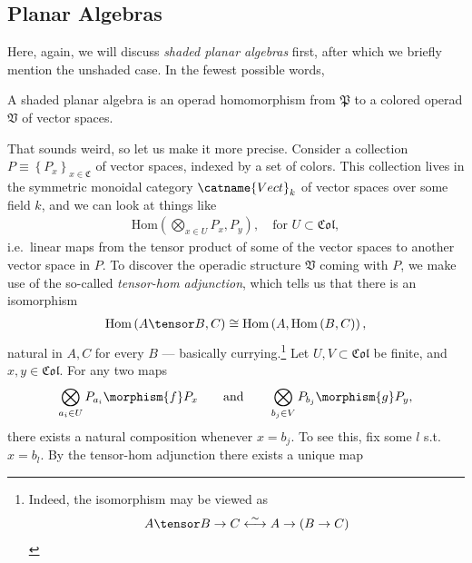 \subsection{Planar Algebras}
Here, again, we will discuss \emph{shaded planar algebras} first, after which we briefly mention the unshaded case. In the fewest possible words,
\begin{center}
\begin{minipage}{0.8\textwidth}
A shaded planar algebra is an operad homomorphism from $\mathfrak{P}$ to a colored operad $\mathfrak{V}$ of vector spaces.\footnotemark
\end{minipage}
\end{center}
That sounds weird, so let us make it more precise. Consider a collection $P\equiv\left\{ P_x \right\}_{x\in\mathfrak{C}}$ of vector spaces, indexed by a set of colors. This collection lives in the symmetric monoidal category $\catname{Vect}_k$ of vector spaces over some field $k$, and we can look at things like
\begin{align*}
\mathrm{Hom}\left( \bigotimes_{x\in U} P_x, P_y\right),\quad \text{for } U\subset\mathfrak{Col},
\end{align*}
i.e.\ linear maps from the tensor product of some of the vector spaces to another vector space in $P$. To discover the operadic structure $\mathfrak{V}$ coming with $P$, we make use of the so-called \emph{tensor-hom adjunction}, which tells us that there is an isomorphism
\begin{align*}
\mathrm{Hom}\left( A\tensor B, C \right)\cong \mathrm{Hom}\left( A,\mathrm{Hom}\left( B,C \right) \right),
\end{align*}
natural in $A, C$ for every $B$ \cite[p 505 f]{aluffi2009algebra} --- basically currying.\footnote{Indeed, the isomorphism may be viewed as
\begin{align*}
A\tensor B \rightarrow C \overset{\sim}{\longleftrightarrow} A\rightarrow\left( B\rightarrow C \right)
\end{align*}
}
Let $U,V\subset \mathfrak{Col}$ be finite, and $x,y\in\mathfrak{Col}$. For any two maps
\begin{align*}
\bigotimes_{a_i\in U} P_{a_i}\morphism{f} P_x \qquad\text{and}\qquad \bigotimes_{b_j\in V} P_{b_j}\morphism{g} P_y,
\end{align*}
there exists a natural composition whenever $x=b_j$. To see this, fix some $l$ s.t.\ $x=b_l$.
By the tensor-hom adjunction there exists a unique map
